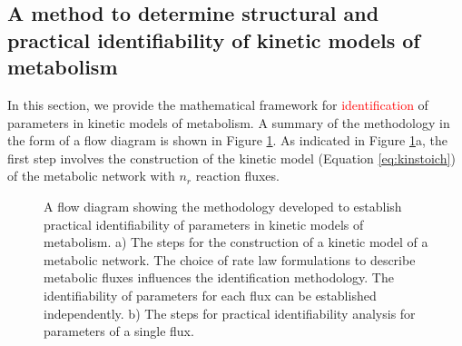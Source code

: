 \documentclass[10pt]{article}
\begin{document}
	\subsection{A method to determine structural and practical identifiability of kinetic models of metabolism}\label{sec:ident}
	In this section, we provide the mathematical framework for \textcolor{red}{identification} of parameters in kinetic models of metabolism. A summary of the methodology in the form of a flow diagram is shown in Figure \ref{fig:ident-flowchart}. As indicated in Figure \ref{fig:ident-flowchart}a, the first step involves the construction of the kinetic model (Equation \ref{eq:kinstoich}) of the metabolic network with $n_r$ reaction fluxes.
	
	\begin{figure}[!tbhp]
		\caption{A flow diagram showing the methodology developed to establish practical identifiability of parameters in kinetic models of metabolism. a) The steps for the construction of a kinetic model of a metabolic network. The choice of rate law formulations to describe metabolic fluxes influences the identification methodology. The identifiability of parameters for each flux can be established independently. b) The steps for practical identifiability analysis for parameters of a single flux.}\label{fig:ident-flowchart}
	\end{figure}	
	
\end{document}
